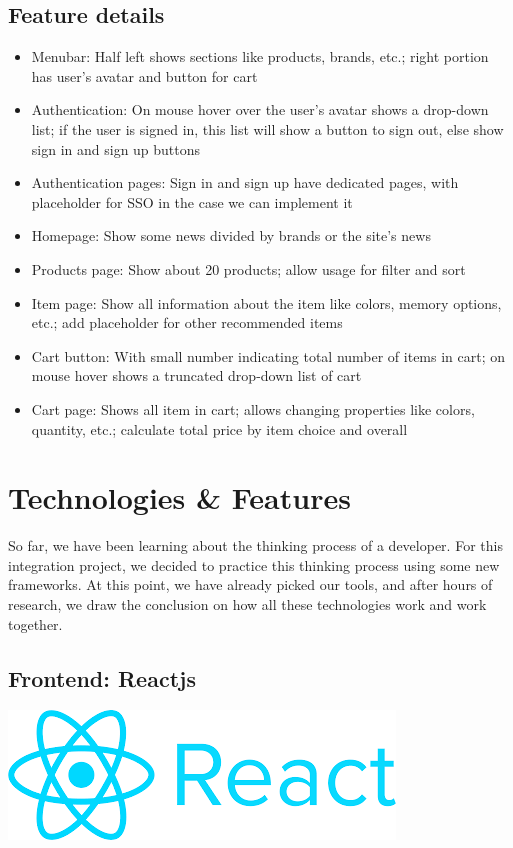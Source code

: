 \documentclass[a4paper]{article}
\numberwithin{equation}{section}
\begin{document}
\subsection{Feature details}
\begin{itemize}
  \item Menubar: Half left shows sections like products, brands, etc.; right portion has user's avatar and button for cart
  \item Authentication: On mouse hover over the user's avatar shows a drop-down list; if the user is signed in, this list will show a button to sign out, else show sign in and sign up buttons
  \item Authentication pages: Sign in and sign up have dedicated pages, with placeholder for SSO in the case we can implement it
  \item Homepage: Show some news divided by brands or the site's news
  \item Products page: Show about 20 products; allow usage for filter and sort
  \item Item page: Show all information about the item like colors, memory options, etc.; add placeholder for other recommended items
  \item Cart button: With small number indicating total number of items in cart; on mouse hover shows a truncated drop-down list of cart
  \item Cart page: Shows all item in cart; allows changing properties like colors, quantity, etc.; calculate total price by item choice and overall
\end{itemize}

\newpage

\section{Technologies \& Features}
So far, we have been learning about the thinking process of a developer.
For this integration project, we decided to practice this thinking process using some new frameworks.
At this point, we have already picked our tools, and after hours of research, we draw the conclusion on how all these technologies work and work together.

\subsection{Frontend: Reactjs}
\includegraphics[width=\textwidth]{assets/reactjs-logo.png}
\end{document}
